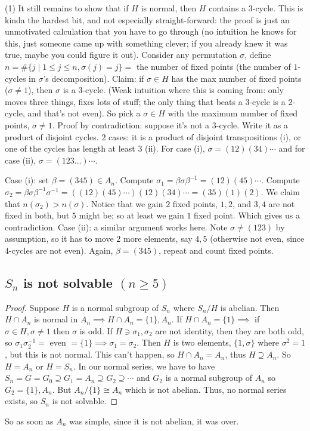 \documentclass{article}
\theoremstyle{plain}
\theoremstyle{remark}
\begin{document}
(1) It still remains to show that if $H$ is normal,
then $H$ contains a $3$-cycle.
This is kinda the hardest bit, and not especially straight-forward:
the proof is just an unmotivated calculation that you have to go through
(no intuition he knows for this, just someone came up with something clever;
if you already knew it was true, maybe you could figure it out).
Consider any permutation $\sigma$, define
$n = \#\{j \mid 1 \leq j \leq n, \sigma(j) = j\} =$ the number of fixed points
(the number of $1$-cycles in $\sigma$'s decomposition).
Claim: if $\sigma \in H$ has the max number of fixed points ($\sigma\neq 1$),
then $\sigma$ is a $3$-cycle.
(Weak intuition where this is coming from:
only moves three things, fixes lots of stuff;
the only thing that beats a $3$-cycle is a $2$-cycle,
and that's not even).
So pick a $\sigma \in H$ with the maximum number of fixed points, $\sigma \neq 1$.
Proof by contradiction: suppose it's not a $3$-cycle.
Write it as a product of disjoint cycles.
$2$ cases: it is a product of disjoint transpositions (i),
or one of the cycles has length at least $3$ (ii).
For case (i), $\sigma = (12)(34)\cdots$ and for case (ii), $\sigma = (123\dots)\cdots$.

Case (i): set $\beta = (345) \in A_n$.
Compute $\sigma_1 = \beta \sigma \beta^{-1} = (12)(45)\cdots$.
Compute $\sigma_2 = \beta \sigma \beta^{-1}\sigma^{-1} = ((12)(45)\cdots)(12)(34)\cdots
= (35)(1)(2)$.
We claim that $n(\sigma_2) > n(\sigma)$.
Notice that we gain $2$ fixed points, $1,2$, and $3,4$ are not fixed in both,
but $5$ might be;
so at least we gain $1$ fixed point.
Which gives us a contradiction.
Case (ii): a similar argument works here.
Note $\sigma \neq (123)$ by assumption, so it has to move $2$ more elements,
say $4,5$ (otherwise not even, since $4$-cycles are not even).
Again, $\beta = (345)$, repeat and count fixed points.

\subsection{$S_n$ is not solvable $(n\geq 5)$}
\begin{proof}
	Suppose $H$ is a normal subgroup of $S_n$ where $S_n / H$ is abelian.
	Then $H \cap A_n$ is normal in $A_n \implies H \cap A_n = \{1\},A_n$.
	If $H \cap A_n = \{1\} \implies$ if $\sigma \in H, \sigma \neq 1$
	then $\sigma$ is odd.
	If $H \ni \sigma_1,\sigma_2$ are not identity, then they are both odd,
	so $\sigma_1\sigma_2^{-1} = $ even $ =\{1\} \implies \sigma_1 = \sigma_2$.
	Then $H$ is two elements, $\{1,\sigma\}$ where $\sigma^2 = 1$,
	but this is not normal.
	This can't happen, so $H \cap A_n = A_n$, thus $H \supseteq A_n$.
	So $H = A_n$ or $H = S_n$.
	In our normal series, we have to have $S_n = G = G_0 \supseteq
	G_1 = A_n \supseteq G_2 \supseteq \cdots$
	and $G_2$ is a normal subgroup of $A_n$ so $G_2 = \{1\}, A_n$.
	But $A_n /\{1\} \cong A_n$ which is not abelian.
	Thus, no normal series exists, so $S_n$ is not solvable.
\end{proof}
So as soon as $A_n$ was simple, since it is not abelian, it was over.
\end{document}
